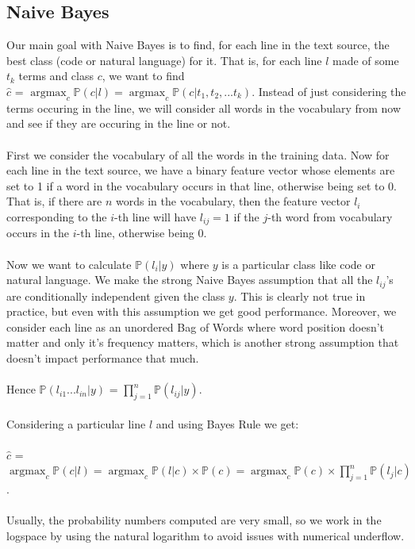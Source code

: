 \documentclass[12pt]{scrreprt}
\DeclareMathOperator*{\argmax}{argmax} %
\newcommand{\pr}{\mathbb{P}}
\begin{document}
\subsection{Naive Bayes}
Our main goal with Naive Bayes is to find, for each line in the text source, the best class (code or natural language) for it. That is, for each line $l$ made of some $t_k$ terms and class $c$, we want to find \\ $\hat{c}$ = $ \argmax_c \pr(c | l) = \argmax_c \pr(c | t_1, t_2, ... t_k)$. Instead of just considering the terms occuring in the line, we will consider all words in the vocabulary from now and see if they are occuring in the line or not.\\
\\ First we consider the vocabulary of all the words in the training data. Now for each line in the text source, we have a binary feature vector whose elements are set to 1 if a word in the vocabulary occurs in that line, otherwise being set to 0. That is, if there are $n$ words in the vocabulary, then the feature vector $l_i$ corresponding to the $i$-th line will have $l_{ij} = 1$ if the $j$-th word from vocabulary occurs in the $i$-th line, otherwise being 0.\\
\\ Now we want to calculate $\mathbb{P}(l_i | y)$ where $y$ is a particular class like code or natural language. We make the strong Naive Bayes assumption that all the $l_{ij}$'s are conditionally independent given the class $y$. This is clearly not true in practice, but even with this assumption we get good performance. 
Moreover, we consider each line as an unordered Bag of Words where word position doesn't matter and only it's frequency matters, which is another strong assumption that doesn't impact performance that much.\\
\\ Hence $\mathbb{P}(l_{i1}...l_{in} | y)$ = $\prod_{j=1}^{n} \mathbb{P}(l_{ij} | y)$. \\
\\ Considering a particular line $l$ and using Bayes Rule we get:\\
\\  $\hat{c}$ = $ \argmax_c \pr(c | l) = \argmax_c \pr(l | c) \times \pr(c)  = \argmax_c  \pr(c) \times \prod_{j=1}^{n} \mathbb{P}(l_{j} | c) $.\\
\\ Usually, the probability numbers computed are very small, so we work in the logspace by using the natural logarithm to avoid issues with numerical underflow.\\
\end{document}

